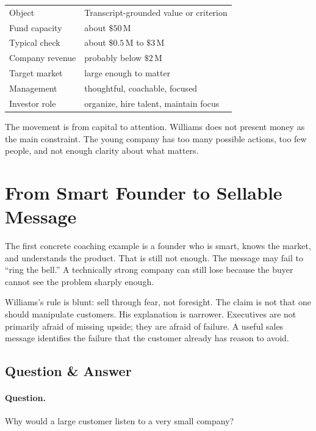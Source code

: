 \begin{table}
\centering
\begin{tabular}{ll}
Object & Transcript-grounded value or criterion \\
Fund capacity & about \(\$50\,\mathrm{M}\) \\
Typical check & about \(\$0.5\,\mathrm{M}\) to \(\$3\,\mathrm{M}\) \\
Company revenue & probably below \(\$2\,\mathrm{M}\) \\
Target market & large enough to matter \\
Management & thoughtful, coachable, focused \\
Investor role & organize, hire talent, maintain focus \\
\end{tabular}
\end{table}

The movement is from capital to attention. Williams does not present money as the main constraint. The young company has too many possible actions, too few people, and not enough clarity about what matters.

\section{From Smart Founder to Sellable Message}

The first concrete coaching example is a founder who is smart, knows the market, and understands the product. That is still not enough. The message may fail to ``ring the bell.'' A technically strong company can still lose because the buyer cannot see the problem sharply enough.

Williams's rule is blunt: sell through fear, not foresight. The claim is not that one should manipulate customers. His explanation is narrower. Executives are not primarily afraid of missing upside; they are afraid of failure. A useful sales message identifies the failure that the customer already has reason to avoid.

\subsection{Question \& Answer}

\paragraph{Question.} Why would a large customer listen to a very small company?

